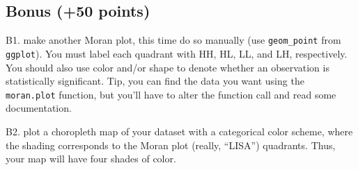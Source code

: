 \documentclass[]{article}
\begin{document}
\subsection{Bonus (+50 points)}\label{bonus-50-points}

B1. make another Moran plot, this time do so manually (use
\texttt{geom\_point} from \texttt{ggplot}). You must label each quadrant
with HH, HL, LL, and LH, respectively. You should also use color and/or
shape to denote whether an observation is statistically significant.
Tip, you can find the data you want using the \texttt{moran.plot}
function, but you'll have to alter the function call and read some
documentation.

B2. plot a choropleth map of your dataset with a categorical color
scheme, where the shading corresponds to the Moran plot (really,
``LISA'') quadrants. Thus, your map will have four shades of color.
\end{document}
